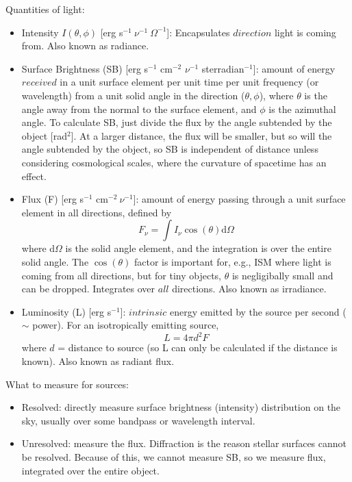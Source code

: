 \documentclass[12pt]{article}
\begin{document}
Quantities of light:
\begin{itemize}
    \item Intensity $I(\theta,\phi)$ [erg s$^{-1}\ \nu^{-1}\ \Omega^{-1}$]:
        Encapsulates $direction$ light is coming from.
        Also known as radiance.
    \item Surface Brightness (SB)
        [erg s$^{-1}$ cm$^{-2}$ $\nu^{-1}$ sterradian$^{-1}$]:
        amount of energy $received$ in a unit surface
        element per unit time per unit frequency (or wavelength) from a unit
        solid angle in the direction ($\theta,\phi$), where $\theta$ is the angle
        away from the normal to the surface element, and $\phi$ is the azimuthal
        angle.
        To calculate SB, just divide the flux by the angle subtended
        by the object [rad$^2$]. At a larger distance, the flux will
        be smaller, but so will the angle subtended by the object, so
        SB is independent of distance unless considering cosmological
        scales, where the curvature of spacetime has an effect.
    \item Flux (F) [erg s$^{-1}$ cm$^{-2}\ \nu^{-1}$]: 
        amount of energy passing through a unit surface element
        in all directions, defined by
        \begin{equation}
            F_{\nu} = \int I_{\nu}\cos(\theta)\textrm{d}\Omega
        \end{equation}
        where d$\Omega$ is the solid angle element, and the integration is
        over the entire solid angle. The $\cos(\theta)$ factor is important
        for, e.g., ISM where light is coming from all directions, but for
        tiny objects, $\theta$ is negligibally small and can be dropped.
        Integrates over $all$ directions.
        Also known as irradiance.
    \item Luminosity (L) [erg s$^{-1}$]:
        $intrinsic$ energy emitted by the source per
        second ($\sim$ power). For an isotropically emitting source,
        \begin{equation}
            L = 4 \pi d^2 F
        \end{equation}
        where $d$ = distance to source (so L can only be calculated if
        the distance is known). Also known as radiant flux.
\end{itemize}
What to measure for sources:
\begin{itemize}
    \item Resolved: directly measure surface brightness (intensity)
        distribution on the sky, usually over some bandpass or wavelength
        interval.
    \item Unresolved: measure the flux. Diffraction is the reason stellar
        surfaces cannot be resolved. Because of this, we cannot measure
        SB, so we measure flux, integrated over the entire object.
\end{itemize}
\end{document}
